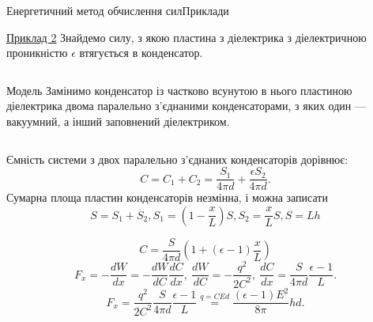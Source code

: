 \documentclass[onlytextwidth]{beamer}
\begin{document}
\begin{frame}{Енергетичний метод обчислення сил}{Приклади}\small
	\begin{exampleblock}{\href{https://www.youtube.com/watch?v=aBAdSE2jC8Y}{Приклад 2}}\justifying
		Знайдемо силу, з якою пластина з діелектрика з діелектричною проникністю $\epsilon$
		втягується в
		конденсатор.
	\end{exampleblock}
	\begin{columns}
		\begin{column}{0.6\linewidth}
			\begin{block}{\scriptsize Модель}\justifying\scriptsize
				Замінимо конденсатор із частково всунутою в нього пластиною діелектрика двома
				паралельно з'єднаними конденсаторами, з яких один --- вакуумний, а інший заповнений
				діелектриком.
			\end{block}
		\end{column}
		\begin{column}{0.4\linewidth}\centering
			
		\end{column}
	\end{columns}
	\begin{overprint}
		\begin{block}{}
			Ємність системи з двох паралельно з'єднаних конденсаторів дорівнює:
			\begin{equation*}
				C = C_1 + C_2 = \frac{S_1}{4\pi d} + \frac{\epsilon S_2}{4\pi d}.
			\end{equation*}
			Сумарна площа пластин конденсаторів незмінна, і можна записати
			\begin{equation*}
				S = S_1 + S_2, S_1 = \left(1- \frac{x}{L} \right)S, S_2 = \frac{x}{L}S, S= Lh
			\end{equation*}
		\end{block}
		\begin{block}{}
			\begin{equation*}
				C = \frac{S}{4\pi d}\left( 1 + (\epsilon -1)\frac{x}{L} \right)
			\end{equation*}
			\begin{equation*}
				F_x = -\frac{dW}{dx} = -\frac{dW}{dC}\frac{dC}{dx},\ \frac{dW}{dC} = -\frac{q^2}{2C^2},\
				\frac{dC}{dx} = \frac{S}{4\pi d} \frac{\epsilon -1}{L}.
			\end{equation*}
			\begin{equation*}
				F_x = \frac{q^2}{2C^2} \frac{S}{4\pi d} \frac{\epsilon -1}{L} \stackrel{q = CEd}{=}
				\frac{(\epsilon -1)E^2}{8\pi} hd.
			\end{equation*}
		\end{block}
	\end{overprint}
\end{frame}
\end{document}
